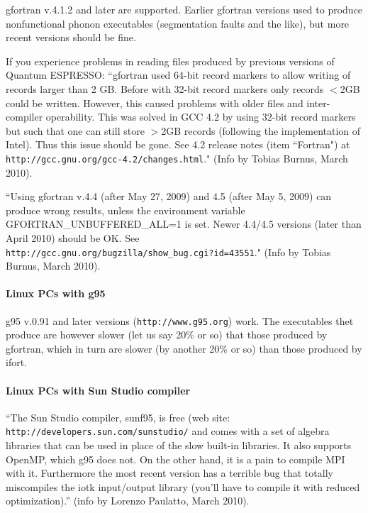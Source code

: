 \documentclass[12pt,a4paper]{article}
\def\qe{{\sc Quantum ESPRESSO}}
\begin{document}
gfortran v.4.1.2 and later are supported. Earlier gfortran versions used to produce nonfunctional phonon executables (segmentation faults and the like), but more recent versions should be fine.

If you experience problems in reading files produced by previous versions
of \qe: ``gfortran used 64-bit record markers to allow writing of records 
larger than 2 GB. Before with 32-bit record markers only records $<$2GB 
could be written. However, this caused problems with older files and 
inter-compiler operability. This was solved in GCC 4.2 by using 32-bit 
record markers but such that one can still store $>$2GB records (following 
the implementation of Intel). Thus this issue should be gone. See 4.2 
release notes (item ``Fortran") at 
\texttt{http://gcc.gnu.org/gcc-4.2/changes.html}."
(Info by Tobias Burnus, March 2010).

``Using gfortran v.4.4 (after May 27, 2009) and 4.5 (after May 5, 2009) can 
produce wrong results, unless the environment variable
GFORTRAN\_UNBUFFERED\_ALL=1 is set. Newer 4.4/4.5 versions
(later than April 2010) should be OK. See\\
\texttt{http://gcc.gnu.org/bugzilla/show\_bug.cgi?id=43551}."
(Info by Tobias Burnus, March 2010).

\paragraph{Linux PCs with g95}

g95 v.0.91 and later versions (\texttt{http://www.g95.org}) work. 
The executables thet produce are however slower (let us say 20\% or so) 
that those produced by gfortran, which in turn are slower 
(by another 20\% or so) than those produced by ifort.

\paragraph{Linux PCs with Sun Studio compiler}

``The Sun Studio compiler, sunf95, is free (web site:
\texttt{http://developers.sun.com/sunstudio/} and comes  
with a set of algebra libraries that can be used in place of the slow 
built-in libraries. It also supports OpenMP, which g95 does not. On the 
other hand, it is a pain to compile MPI with it. Furthermore the most
recent version has a terrible bug that totally miscompiles the iotk 
input/output library (you'll have to compile it with reduced optimization).''
(info by Lorenzo Paulatto, March 2010).
\end{document}
